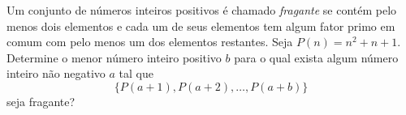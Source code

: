 Um conjunto de números inteiros positivos é chamado \emph{fragante} se contém pelo menos dois elementos e cada um de seus elementos tem algum fator primo em comum com pelo menos um dos elementos restantes. Seja $P(n) = n^2 + n + 1$.  Determine o menor número inteiro positivo $b$ para o qual exista algum número inteiro não negativo $a$ tal que \[\{P(a+1),P(a+2),\ldots,P(a+b)\}\] seja fragante?
